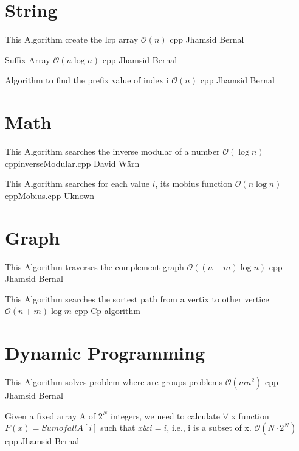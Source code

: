 \section{String}

{This Algorithm create the lcp array}
{$\mathcal{O}(n)$}
{cpp}{}
{Jhamsid Bernal}

{Suffix Array}
{$\mathcal{O}(n \log{n})$}
{cpp}{}
{Jhamsid Bernal}
\progress

{Algorithm to find the prefix value of index i}
{$\mathcal{O}(n)$}
{cpp}{}
{Jhamsid Bernal}
\progress

\section{Math}

{This Algorithm searches the inverse modular of a number}
{$\mathcal{O}(\log{n})$}
{cpp}{inverseModular.cpp}
{David Wärn}

{This Algorithm searches for each value $i$, its mobius function}
{$\mathcal{O}(n\log{n})$}
{cpp}{Mobius.cpp}
{Uknown}

\section{Graph}

{This Algorithm traverses the complement graph}
{$\mathcal{O}((n + m)\log{n})$}
{cpp}{}
{Jhamsid Bernal}
\progress

{This Algorithm searches the sortest path from a vertix to other vertice}
{$\mathcal{O}(n + m)\log{m}$}
{cpp}{}
{Cp algorithm}

\section{Dynamic Programming}

{This Algorithm solves problem where are groups problems}
{$\mathcal{O}(mn^2)$}
{cpp}{}
{Jhamsid Bernal}
\progress

{Given a fixed array A of $2^N$ integers, we need to calculate $\forall$
x function $F(x) = Sum of all A[i]$ such that $x\&i = i$, i.e., i is a subset 
of x.}
{$\mathcal{O}(N \cdot 2^N)$}
{cpp}{}
{Jhamsid Bernal}
